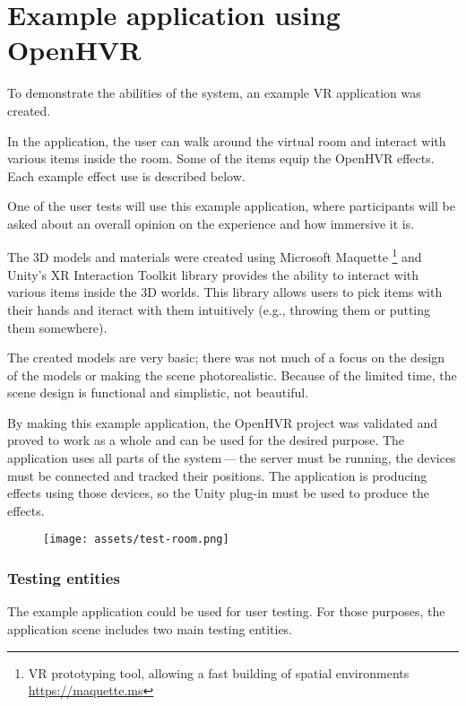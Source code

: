 \chapter{Example application using OpenHVR}

To demonstrate the abilities of the system, an example VR application
was created.


In the application, the user can walk around the virtual room and interact with
various items inside the room. Some of the items equip the OpenHVR
effects. Each example effect use is described below.


One of the user tests will use this example application, where
participants will be asked about an overall opinion on the experience and
how immersive it is.


The 3D models and materials were created using Microsoft Maquette
\footnote{VR prototyping tool, allowing a fast building of spatial environments \href{https://maquette.ms}{https://maquette.ms}}
and Unity’s XR Interaction Toolkit library provides the ability to
interact with various items inside the 3D worlds. This library allows users to
pick items with their hands and iteract with them intuitively (e.g., throwing them
or putting them somewhere).


The created models are very basic; there was not much of a focus on the design
of the models or making the scene photorealistic. Because of the limited time,
the scene design is functional and simplistic, not beautiful.


By making this example application, the OpenHVR project was validated and proved
to work as a whole and can be used for the desired purpose. The application uses
all parts of the system — the server must be running, the devices must be
connected and tracked their positions. The application is producing effects
using those devices, so the Unity plug-in must be used to produce the effects.


\begin{figure}[h]{}
\centering\texttt{[image: assets/test-room.png]}
\caption{}

\end{figure}

\hypertarget{x-testing-entities}{\subsection*{Testing entities}}
The example application could be used for user testing. For those purposes,
the application scene includes two main testing entities.


